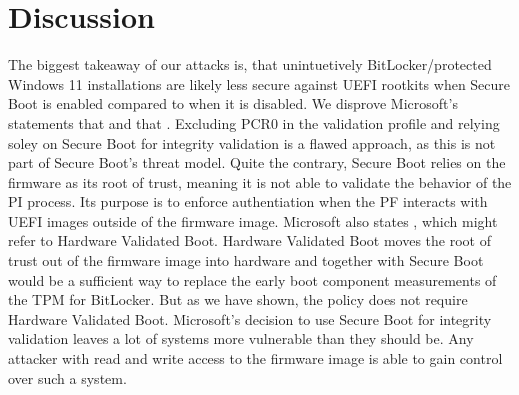 


\chapter{Discussion}

The biggest takeaway of our attacks is, that unintuetively BitLocker\-/protected Windows 11 installations are likely less secure against \ac{UEFI} rootkits when Secure Boot is enabled compared to when it is disabled.
We disprove Microsoft's statements that  and that .
Excluding \ac{PCR}0 in the validation profile and relying soley on Secure Boot for integrity validation is a flawed approach, as this is not part of Secure Boot's threat model.
Quite the contrary, Secure Boot relies on the firmware as its root of trust, meaning it is not able to validate the behavior of the \ac{PI} process.
Its purpose is to enforce authentiation when the \ac{PF} interacts with \ac{UEFI} images outside of the firmware image.
Microsoft also states , which might refer to Hardware Validated Boot.
Hardware Validated Boot moves the root of trust out of the firmware image into hardware and together with Secure Boot would be a sufficient way to replace the early boot component measurements of the \ac{TPM} for BitLocker.
But as we have shown, the policy does not require Hardware Validated Boot.
Microsoft's decision to use Secure Boot for integrity validation leaves a lot of systems more vulnerable than they should be.
Any attacker with read and write access to the firmware image is able to gain control over such a system.
